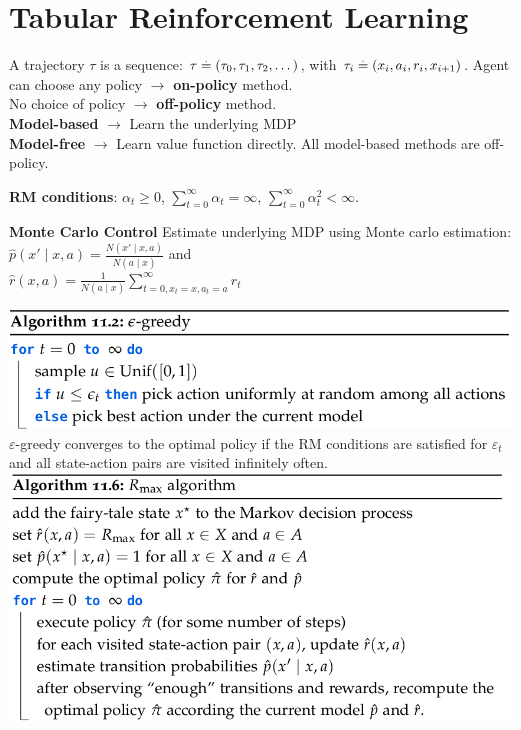 \section{Tabular Reinforcement Learning}

A trajectory $\tau$ is a sequence: $\tau \overset{.}{=} (\tau_0, \tau_1, \tau_2, \dots)$, with $\tau_i \overset{.}{=} (x_i, a_i, r_i, x_{i+1})$.
Agent can choose any policy $\rightarrow$ \textbf{on-policy} method. \\
No choice of policy $\rightarrow$ \textbf{off-policy} method. \\
\textbf{Model-based} $\rightarrow$ Learn the underlying MDP \\
\textbf{Model-free} $\rightarrow$ Learn value function directly.
All model-based methods are off-policy.
\begin{framed}
    \textbf{RM conditions}: $\alpha_t \geq 0$, $\sum_{t=0}^{\infty}{\alpha_t} = \infty$, $\sum_{t=0}^{\infty}{\alpha_t^2} < \infty$.
\end{framed}
\begin{framed}
    \textbf{Monte Carlo Control}
    Estimate underlying MDP using Monte carlo estimation:
    ${\hat{p}(x' \mid x, a) = \frac{N(x' \mid x, a)}{N(a \mid x)}}$ and \\ ${\hat{r}(x, a) = \frac{1}{N(a \mid x)} \sum_{t = 0, x_t = x,a_t = a}^\infty r_t}$
\end{framed}
\includegraphics[width=0.95\linewidth,trim={0 0 3cm 0}]{images/epsilon_greedy.png}
\(\varepsilon\)-greedy converges to the optimal policy if the RM conditions are satisfied for \(\varepsilon_t\) and all state-action pairs are visited infinitely often.
\includegraphics[width=0.95\linewidth, trim={0 0 3cm 0}]{images/R_max.png}
